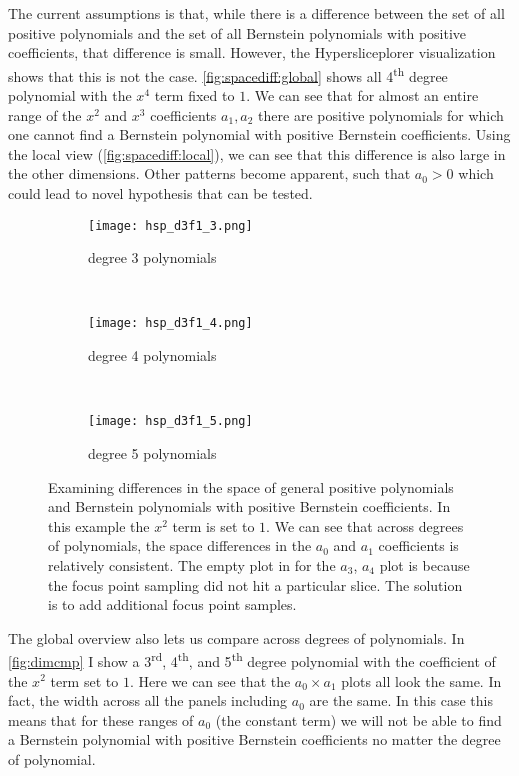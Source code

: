 The current assumptions is that, while there is a difference between the set of all positive polynomials and the set of all Bernstein polynomials with positive coefficients,
that difference is small. However, the Hypersliceplorer visualization shows
that this is not the case. \autoref{fig:spacediff:global} 
shows all 4\textsuperscript{th} degree polynomial with the $x^4$ term fixed to
$1$. We can see that for almost an entire range of the $x^2$ and $x^3$
coefficients $a_1, a_2$ there are positive polynomials for which one cannot find a
Bernstein polynomial with positive Bernstein coefficients. Using the local view
(\autoref{fig:spacediff:local}), we can see that this difference is also
large in the other dimensions. Other patterns become apparent, such that $a_0>0$ which could lead to novel hypothesis that can be tested.

\begin{figure*}
  \centering
  \begin{subfigure}[b]{0.3\textwidth}
    \texttt{[image: hsp\_d3f1\_3.png]}
    \caption{degree 3 polynomials}
    \label{fig:dimcmp:3}
  \end{subfigure}
  ~
  \begin{subfigure}[b]{0.3\textwidth}
    \texttt{[image: hsp\_d3f1\_4.png]}
    \caption{degree 4 polynomials}
    \label{fig:dimcmp:4}
  \end{subfigure}
  ~
  \begin{subfigure}[b]{0.3\textwidth}
    \texttt{[image: hsp\_d3f1\_5.png]}
    \caption{degree 5 polynomials}
    \label{fig:dimcmp:5}
  \end{subfigure}
  \caption[Differences in the space of general positive polynomials and Bernstein polynomials with positive Bernstein coefficients.]{%
    Examining differences in the space of general positive polynomials and Bernstein 
    polynomials with positive Bernstein coefficients. In this example the 
    $x^2$ term is set to $1$. We can see that across degrees of polynomials,
    the space differences in the $a_0$ and $a_1$ coefficients is relatively
    consistent. The empty plot in  for the $a_3$, $a_4$
    plot is because the focus point sampling did not hit a particular slice.
    The solution is to add additional focus point samples. 
  }
  \label{fig:dimcmp}
\end{figure*}

The global overview also lets us compare across degrees of polynomials.
In \autoref{fig:dimcmp} I show a 3\textsuperscript{rd}, 4\textsuperscript{th},
and 5\textsuperscript{th} degree polynomial with the coefficient of the $x^2$
term set to $1$. Here we can see that the $a_0 \times a_1$ plots all look the same.
In fact, the width across all the panels including $a_0$ are the same. In this
case this means that for these ranges of $a_0$ (the constant term) we will not
be able to find a Bernstein polynomial with positive Bernstein coefficients
no matter the degree of polynomial. 


